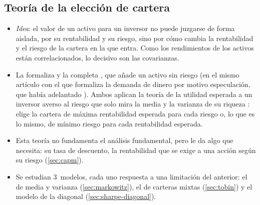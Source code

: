 \documentclass[11pt]{article}
\begin{document}
\begin{infografia}[H]
\centering
\caption{Las 3~maneras de analizar una acción: qué aporta cada modelo y por qué se pasa al siguiente}\label{figu:mapa-analisis}
\end{infografia}

\subsection{Teoría de la elección de cartera}\label{sec:eleccion-cartera}

\begin{itemize}
\item \emph{Idea}: el valor de un activo para un inversor no puede juzgarse de forma aislada, por su rentabilidad y su riesgo, sino por cómo cambia la rentabilidad y el riesgo de la cartera en la que entra. Como los rendimientos de los activos están correlacionados, lo decisivo son las covarianzas.
\item La formaliza \textcite{Markowitz1952Portfolio} y la completa \textcite{Tobin1958Liquidity}, que añade un activo sin riesgo (en el mismo artículo con el que formaliza la demanda de dinero por motivo especulación, que había adelantado  ). Ambos aplican la teoría de la utilidad esperada a un inversor averso al riesgo que solo mira la media y la varianza de su riqueza : elige la cartera de máxima rentabilidad esperada para cada riesgo o, lo que es lo mismo, de mínimo riesgo para cada rentabilidad esperada.
\item Esta teoría no fundamenta el análisis fundamental, pero le da algo que necesita: su tasa de descuento, la rentabilidad que se exige a una acción según su riesgo (\ref{sec:capm}).
\item Se estudian 3~modelos, cada uno respuesta a una limitación del anterior: el de media y varianza (\ref{sec:markowitz}), el de carteras mixtas (\ref{sec:tobin}) y el modelo de la diagonal (\ref{sec:sharpe-diagonal}).
\end{itemize}
\end{document}
